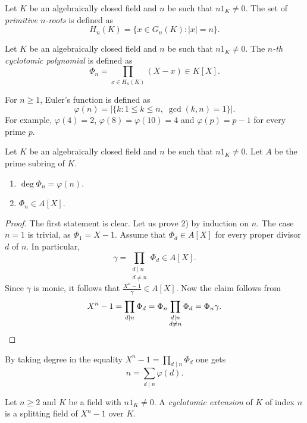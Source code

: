 Let $K$ be an algebraically closed field and $n$ be
such that $n1_K\ne0$. The set of 
\emph{primitive $n$-roots} is defined as 
\[
H_n(K)=\{x\in G_n(K):|x|=n\}.
\]

\begin{definition}
    Let $K$ be an algebraically closed field and $n$ be
    such that $n1_K\ne0$. The \emph{$n$-th cyclotomic
    polynomial} is defined as 
    \[
    \Phi_n=\prod_{x\in H_n(K)}(X-x)\in K[X].
    \]
\end{definition}

For $n\geq1$, Euler's function is defined as 
\[
\varphi(n)=|\{k:1\leq k\leq n,\;\gcd(k,n)=1\}|.
\]
For example, $\varphi(4)=2$, $\varphi(8)=\varphi(10)=4$ and $\varphi(p)=p-1$ for every prime $p$. 

\begin{proposition}
    Let $K$ be an algebraically closed field and $n$ be
    such that $n1_K\ne0$. Let $A$ be
    the prime subring of $K$. 
    \begin{enumerate}
        \item $\deg\Phi_n=\varphi(n)$.
        \item $\Phi_n\in A[X]$.
    \end{enumerate}
\end{proposition}

\begin{proof}
    The first statement is clear. Let us prove 2) by induction on $n$. The case $n=1$ is
    trivial, as $\Phi_1=X-1$. 
    Assume that $\Phi_d\in A[X]$ for every proper divisor $d$ of $n$. In particular,
    \[
    \gamma=\prod_{\substack{d\mid n\\d\ne n}}\Phi_d\in A[X].
    \]
    Since $\gamma$ is monic, it follows that 
    $\frac{X^n-1}{\gamma}\in A[X]$. Now the claim follows from 
    \[
    X^n-1=\prod_{d\mid n}\Phi_d=\Phi_n\prod_{\substack{d\mid n\\d\ne n}}\Phi_d=\Phi_n\gamma.\qedhere
    \]
\end{proof}

By taking degree in the equality 
$X^n-1=\prod_{d\mid n}\Phi_d$ 
one gets 
\[
n=\sum_{d\mid n}\varphi(d).
\]

\begin{definition}
\label{defn:cyclotomic}
    Let $n\geq2$ and $K$ be a field with $n1_K\ne0$. A 
    \emph{cyclotomic extension} of $K$ of index $n$ is a 
    splitting field of $X^n-1$ over $K$. 
\end{definition}

